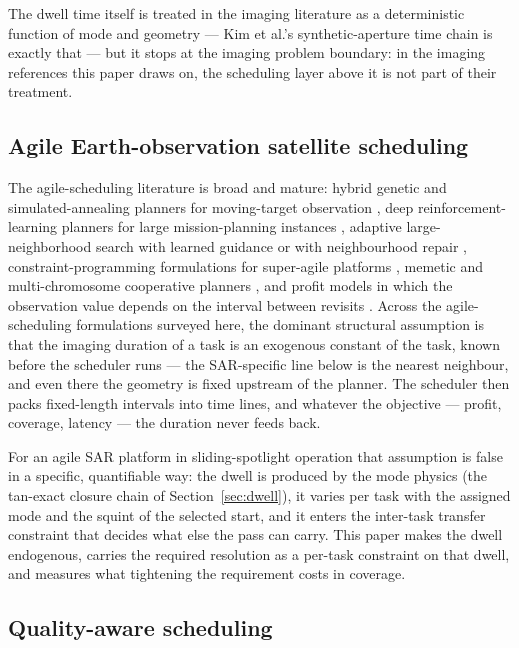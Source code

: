 \documentclass[preprint,authoryear]{elsarticle}
\begin{document}
The dwell time itself is treated in the imaging literature as a deterministic function of mode and geometry --- Kim et al.'s synthetic-aperture time chain is exactly that \citep{kim2021optimal} --- but it stops at the imaging problem boundary: in the imaging references this paper draws on, the scheduling layer above it is not part of their treatment.

\subsection{Agile Earth-observation satellite scheduling}

The agile-scheduling literature is broad and mature: hybrid genetic and simulated-annealing planners for moving-target observation \citep{qin2024multisatellite}, deep reinforcement-learning planners for large mission-planning instances \citep{long2024deep,chen2024learning,zhang2025deep}, adaptive large-neighborhood search with learned guidance or with neighbourhood repair \citep{du2025satellite,he2018a}, constraint-programming formulations for super-agile platforms \citep{caleiras2026a}, memetic and multi-chromosome cooperative planners \citep{wang2024memetic,wang2024research}, and profit models in which the observation value depends on the interval between revisits \citep{li2024earth,peng2019agile}. Across the agile-scheduling formulations surveyed here, the dominant structural assumption is that the imaging duration of a task is an exogenous constant of the task, known before the scheduler runs --- the SAR-specific line below is the nearest neighbour, and even there the geometry is fixed upstream of the planner. The scheduler then packs fixed-length intervals into time lines, and whatever the objective --- profit, coverage, latency --- the duration never feeds back.

For an agile SAR platform in sliding-spotlight operation that assumption is false in a specific, quantifiable way: the dwell is produced by the mode physics (the tan-exact closure chain of Section~\ref{sec:dwell}), it varies per task with the assigned mode and the squint of the selected start, and it enters the inter-task transfer constraint that decides what else the pass can carry. This paper makes the dwell endogenous, carries the required resolution as a per-task constraint on that dwell, and measures what tightening the requirement costs in coverage.

\subsection{Quality-aware scheduling}
\end{document}
